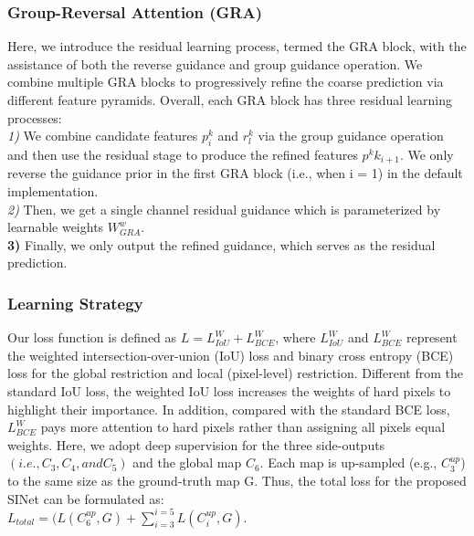 \begin{multicols}{2}
\subsubsection{{{\fontsize{13}{17}\selectfont \textbf{Group-Reversal Attention (GRA)}}}}\cite{attention}
Here, we introduce the residual learning process, termed the GRA block, with the assistance of both the reverse guidance and group guidance operation. We combine multiple GRA blocks to progressively refine the coarse prediction via different feature pyramids. Overall, each GRA block has three residual learning processes:\\
\textit{1)} We combine candidate features \(p^k_i\) and \(r^k_l\) via the group guidance operation and then use the residual stage to produce the refined features \(p^kk_{i+1}\). We only reverse the guidance prior in the first GRA block (i.e., when i = 1) in the default implementation. \\
\textit{2)} Then, we get a single channel residual guidance which is parameterized by learnable weights \(W^w_{GRA}\).\\
\textbf{3)} Finally, we only output the refined guidance, which serves as the residual prediction.
\vspace{0.5cm}
\subsubsection{{{\fontsize{13}{17}\selectfont \textbf{Learning Strategy}}}}
Our loss function is defined as \(L = L^W_{IoU} + L^W_{BCE}\), where \(L^W_{IoU}\) and \(L^W_{BCE}\)\cite{heera2019binary} represent the weighted intersection-over-union (IoU) loss and binary cross entropy (BCE) loss for the global restriction and local (pixel-level) restriction. Different from the standard IoU loss, the weighted IoU loss increases the weights of hard pixels to highlight their importance. In addition, compared with the standard BCE loss, \(L^W_{BCE}\) pays more attention to hard pixels rather than assigning all pixels equal weights. Here, we adopt deep supervision for the three side-outputs \((i.e., C_3, C_4, and C_5)\) and the global map \(C_6\). Each map is up-sampled (e.g., \(C^{up}_3\)) to the same size as the ground-truth map G. Thus, the total loss for the proposed SINet can be formulated as:\\
 \({L}_{total} = (\textit{L}(\textit{C}^{up}_6 , \textit{G}) + \sum^{i=5}_{i=3}\textit{L}(\textit{C}^{up}_i , \textit{G})\).
 
\vspace{0.5cm}

\end{multicols}
